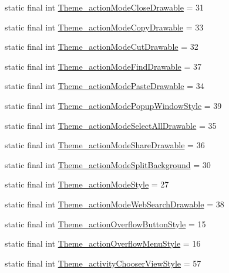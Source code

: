 \begin{DoxyCompactItemize}
\item 
static final int \hyperlink{classcheck_1_1test_1_1_r_1_1styleable_a4a3a5d915cea1a08a892eb22d86aa5b1}{Theme\+\_\+action\+Mode\+Close\+Drawable} = 31
\item 
static final int \hyperlink{classcheck_1_1test_1_1_r_1_1styleable_ada960b6879c62666803bc7cbfd549a66}{Theme\+\_\+action\+Mode\+Copy\+Drawable} = 33
\item 
static final int \hyperlink{classcheck_1_1test_1_1_r_1_1styleable_a46d9dab18374fb132f95dae524a5d910}{Theme\+\_\+action\+Mode\+Cut\+Drawable} = 32
\item 
static final int \hyperlink{classcheck_1_1test_1_1_r_1_1styleable_af1e1008c65426da3eab077f1a462c7cb}{Theme\+\_\+action\+Mode\+Find\+Drawable} = 37
\item 
static final int \hyperlink{classcheck_1_1test_1_1_r_1_1styleable_a537cf24632f0159627a389b005b5ad7d}{Theme\+\_\+action\+Mode\+Paste\+Drawable} = 34
\item 
static final int \hyperlink{classcheck_1_1test_1_1_r_1_1styleable_a7430b605b613f3c152e57fba4ec0f106}{Theme\+\_\+action\+Mode\+Popup\+Window\+Style} = 39
\item 
static final int \hyperlink{classcheck_1_1test_1_1_r_1_1styleable_a0b1f83e691b070515cd68592dacf387b}{Theme\+\_\+action\+Mode\+Select\+All\+Drawable} = 35
\item 
static final int \hyperlink{classcheck_1_1test_1_1_r_1_1styleable_a834d173801ca8819888d149a2adb6a9e}{Theme\+\_\+action\+Mode\+Share\+Drawable} = 36
\item 
static final int \hyperlink{classcheck_1_1test_1_1_r_1_1styleable_a8f38579426c6d3ff9440e1e2dce58bc6}{Theme\+\_\+action\+Mode\+Split\+Background} = 30
\item 
static final int \hyperlink{classcheck_1_1test_1_1_r_1_1styleable_a21f32ef93d16b662bb12165a0ebee2be}{Theme\+\_\+action\+Mode\+Style} = 27
\item 
static final int \hyperlink{classcheck_1_1test_1_1_r_1_1styleable_aa5a92d7f473a39b7ff9ace293dc4d2d5}{Theme\+\_\+action\+Mode\+Web\+Search\+Drawable} = 38
\item 
static final int \hyperlink{classcheck_1_1test_1_1_r_1_1styleable_a43f29fc1f3579d42bcc1e4bbd4c853c6}{Theme\+\_\+action\+Overflow\+Button\+Style} = 15
\item 
static final int \hyperlink{classcheck_1_1test_1_1_r_1_1styleable_a56ea39fe4c79a7e03d3181b96f1995f3}{Theme\+\_\+action\+Overflow\+Menu\+Style} = 16
\item 
static final int \hyperlink{classcheck_1_1test_1_1_r_1_1styleable_a5df6cc2d9245f0001ee13f7cb5b95869}{Theme\+\_\+activity\+Chooser\+View\+Style} = 57

\end{DoxyCompactItemize}
